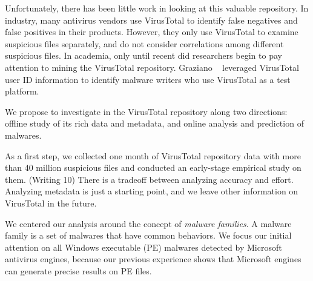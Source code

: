 

Unfortunately, there has been little work in looking at this valuable repository.
In industry, many antivirus vendors use VirusTotal to identify false negatives 
and false positives in their products. 
However, they only use VirusTotal to examine suspicious files separately, 
and do not consider correlations among different suspicious files. 
In academia, only until recent did researchers begin to pay attention to mining the VirusTotal repository. 
Graziano \etal~\cite{neeles} leveraged VirusTotal user ID information to identify malware writers 
who use VirusTotal as a test platform. 



We propose to investigate in the VirusTotal repository along two directions:
offline study of its rich data and metadata, 
and online analysis and prediction of malwares.

As a first step, we collected one month of VirusTotal repository data with more than 40 million suspicious files
and conducted an early-stage empirical study on them. 
{\color{red} (Writing 10) There is a tradeoff between analyzing accuracy and effort. 
Analyzing metadata is just a starting point, and we leave other information on VirusTotal in the future. }

We centered our analysis around the concept of {\em malware families}.
A malware family is a set of malwares that have common behaviors.
We focus our initial attention on all Windows executable (PE) malwares detected by Microsoft
antivirus engines, 
because our previous experience shows that Microsoft engines can generate precise results on PE files.

